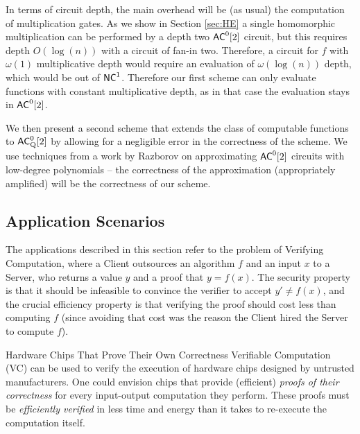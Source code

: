In terms of circuit depth, the main overhead will be (as usual)
the computation of multiplication gates. As we 
 show in Section \ref{sec:HE} a single homomorphic multiplication can be performed by a depth two ${\mathsf{AC}}^0[2]$ circuit, but this requires depth $O(\log(n))$ with a circuit of fan-in two. Therefore, a circuit for $f$ with $\omega(1)$ multiplicative depth would require an evaluation of $\omega(\log(n))$ depth, which would be out of ${\mathsf{NC}}^1$. Therefore our first scheme can only evaluate
 functions with constant multiplicative depth, as in that case the evaluation stays in ${\mathsf{AC}}^0[2]$. 
 
We then present a second scheme that extends the class of computable functions 
to ${\mathsf{AC}}^0_{\text{Q}}[2]$ by allowing for a negligible error in the correctness of the scheme. We use techniques from a work by Razborov \cite{razborov1987lower} on approximating ${\mathsf{AC}}^0[2]$ circuits with low-degree polynomials -- the correctness of the approximation (appropriately amplified) will be the correctness of our scheme. 



\subsection{Application Scenarios}

The applications described in this section refer to the problem of Verifying Computation, where a Client outsources an algorithm $f$ and an input $x$ to a Server, who returns a value $y$ and a proof that $y=f(x)$. The security property is that it should be infeasible to convince the verifier to accept $y' \neq f(x)$, and the crucial efficiency property is that verifying the proof should cost less than computing $f$ (since avoiding that cost was the reason the Client hired the Server to compute $f$). 

\medskip
\noindent
{\sc Hardware Chips That Prove Their Own Correctness}
Verifiable Computation (VC) can be used to verify the execution of hardware chips designed by untrusted manufacturers. One could envision chips that provide (efficient) \emph{proofs of their correctness} for every input-output computation they perform. These proofs must be  \emph{efficiently verified} in less time and energy than it takes to re-execute the computation itself. 

